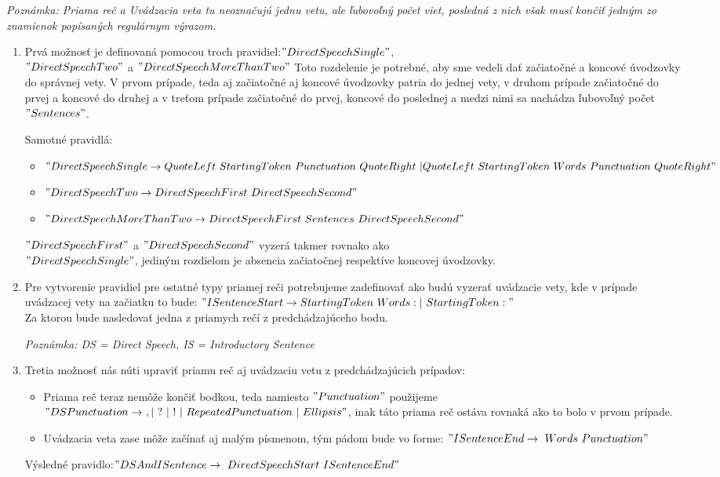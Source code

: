 \documentclass[12pt,a4paper]{report}
\theoremstyle{definition}
\theoremstyle{remark}
\begin{document}
\textit{Poznámka: Priama reč a Uvádzacia veta tu neoznačujú jednu vetu, ale ľubovoľný počet viet, posledná z nich však musí končiť jedným zo znamienok popísaných regulárnym výrazom.}

\begin{enumerate}[leftmargin=*]
\item Prvá možnosť je definovaná pomocou troch pravidiel:$"DirectSpeechSingle"$,  \\$"DirectSpeechTwo"$ a $"DirectSpeechMoreThanTwo"$
Toto rozdelenie je potrebné, aby sme vedeli dať začiatočné a koncové úvodzovky do správnej vety. V prvom prípade, teda aj začiatočné aj koncové úvodzovky patria do jednej vety, v druhom prípade začiatočné do prvej a koncové do druhej a v treťom prípade začiatočné do prvej, koncové do poslednej a medzi nimi sa nachádza ľubovoľný počet $"Sentences"$.


\noindent Samotné pravidlá:
\begin{itemize}
\item $"DirectSpeechSingle \to \\
QuoteLeft \ StartingToken \ Punctuation \ QuoteRight \ |\\ QuoteLeft \ StartingToken \ Words \ Punctuation \ QuoteRight"$
\item $"DirectSpeechTwo \to DirectSpeechFirst \ DirectSpeechSecond"$
\item $"DirectSpeechMoreThanTwo \to \\ DirectSpeechFirst \ Sentences \ DirectSpeechSecond"$
\end{itemize}
 $"DirectSpeechFirst"$ a $" DirectSpeechSecond"$ vyzerá takmer rovnako ako \\ $"DirectSpeechSingle"$, jediným rozdielom je absencia začiatočnej respektíve koncovej úvodzovky.
\item Pre vytvorenie pravidiel pre ostatné typy priamej reči potrebujeme zadefinovať ako budú vyzerať uvádzacie vety, kde v prípade uvádzacej vety na začiatku to bude:
$"ISentenceStart \to StartingToken \ Words : | \ StartingToken :"$ \\ Za ktorou bude nasledovať jedna z priamych rečí z predchádzajúceho bodu.

\textit{Poznámka: DS = Direct Speech, IS = Introductory Sentence}

\item Tretia možnosť nás núti upraviť priamu reč aj uvádzaciu vetu z predchádzajúcich prípadov:
	\begin{itemize}
	\item Priama reč teraz nemôže končiť bodkou, teda namiesto $"Punctuation"$  použijeme $"DSPunctuation \to \ , | \ ? \ | \ ! \  | \ RepeatedPunctuation \ | \ Ellipsis"$, inak táto priama reč ostáva rovnaká ako to bolo v prvom prípade.
	\item Uvádzacia veta zase môže začínať aj malým písmenom, tým pádom bude vo forme: $"ISentenceEnd \to \ Words \ Punctuation"$
	\end{itemize}
Výsledné pravidlo:$"DSAndISentence \to \ DirectSpeechStart \ ISentenceEnd"$


\end{enumerate}
\end{document}
